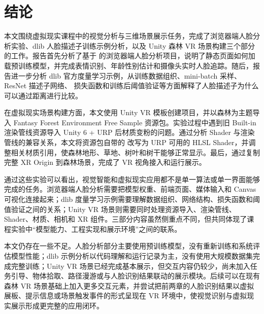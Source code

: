 \section{结论}
本文围绕虚拟现实课程中的视觉分析与三维场景展示任务，完成了浏览器端人脸分析实验、dlib 人脸描述子训练示例分析，以及 Unity 森林 VR 场景构建三个部分的工作。报告首先分析了基于  的浏览器端人脸分析项目，说明了静态页面如何加载预训练模型，并完成表情识别、年龄性别估计和摄像头实时人脸追踪。随后，报告进一步分析 dlib 官方度量学习示例，从训练数据组织、mini-batch 采样、ResNet 描述子网络、 损失函数和训练后阈值验证等方面解释了人脸描述子为什么可以通过距离进行比较。

在虚拟现实场景构建方面，本文使用 Unity VR 模板创建项目，并以森林为主题导入 Fantasy Forest Environment Free Sample 资源包。实验过程中遇到旧 Built-in 渲染管线资源导入 Unity 6 + URP 后材质变粉的问题。通过分析 Shader 与渲染管线的兼容关系，本文将资源包自带的  改写为 URP 可用的 HLSL Shader，并调整相关材质引用，使森林地形、草地、树叶和树干能够正常显示。最后，通过复制完整 XR Origin 到森林场景，完成了 VR 视角接入和运行展示。

通过这些实验可以看出，视觉智能和虚拟现实应用都不是单一算法或单一界面能够完成的任务。浏览器端人脸分析需要把模型权重、前端页面、媒体输入和 Canvas 可视化连接起来；dlib 度量学习示例需要理解数据组织、网络结构、损失函数和阈值验证之间的关系；Unity VR 场景则需要同时处理资源导入、渲染管线、Shader、材质、相机和 XR 组件。三部分内容虽然侧重点不同，但共同体现了课程实验中“模型能力、工程实现和展示环境”之间的联系。

本文仍存在一些不足。人脸分析部分主要使用预训练模型，没有重新训练和系统评估模型性能；dlib 示例分析以代码理解和运行记录为主，没有使用大规模数据集完成完整训练；Unity VR 场景已经完成基本展示，但交互内容仍较少，尚未加入任务引导、物体拾取、路径漫游或与人脸识别结果联动的展示模块。后续可以在现有森林 VR 场景基础上加入更多交互元素，并尝试把前两章的人脸识别结果以虚拟展板、提示信息或场景触发事件的形式呈现在 VR 环境中，使视觉识别与虚拟现实展示形成更完整的应用闭环。
